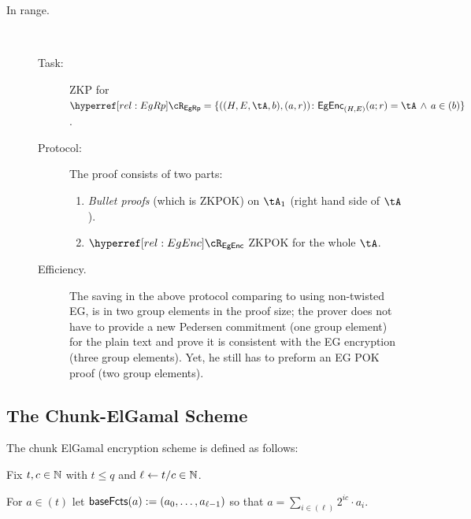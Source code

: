 \begin{description}
	\item[In range.] ~
	\begin{description}
		\item[Task:] ZKP for $\rEgRp =\rEgRpDef$.\label{rel:EgRp}
		
		\item[Protocol:]  The proof consists of two parts:
		\begin{enumerate}
			\item  \textit{Bullet proofs} \cite{SP:BBBPWM18}  (which is  ZKPOK) on $\tA_1$ (\ie right hand side of $\tA$).   
			
			
			
			\item   $\rEgEnc$ ZKPOK  for the whole $\tA$.
			
			
		\end{enumerate}


\item[Efficiency.]
	The saving in the above protocol comparing to using  non-twisted EG, is in  two  group elements in the proof size;  the prover does not have to provide a new Pedersen commitment (one group element)  for the plain text and prove it is consistent with the EG encryption (three group elements). Yet, he still has to preform an EG POK proof (two group elements).
		
	\end{description}

\end{description}





	
\subsection{The Chunk-ElGamal  Scheme}\label{sec:ChanksEg:EgScheme}
The chunk ElGamal encryption scheme  is defined as follows:


\newcommand{\cs}{c}
\begin{notation}
Fix $t,\cs\in \N$ with $t\le q$ and $\ell \leftarrow t/c \in {\mathbb{N}}$. 	
\end{notation}

\begin{definition}\label{def:basefactor}
For $a\in (t)$ let $\mathsf{baseFcts}(a) := (a_0,\ldots,a_{\ell-1})$ so that $a =  \sum_{i \in (\ell)}    2^{i \cs} \cdot a_i$.
\end{definition}


